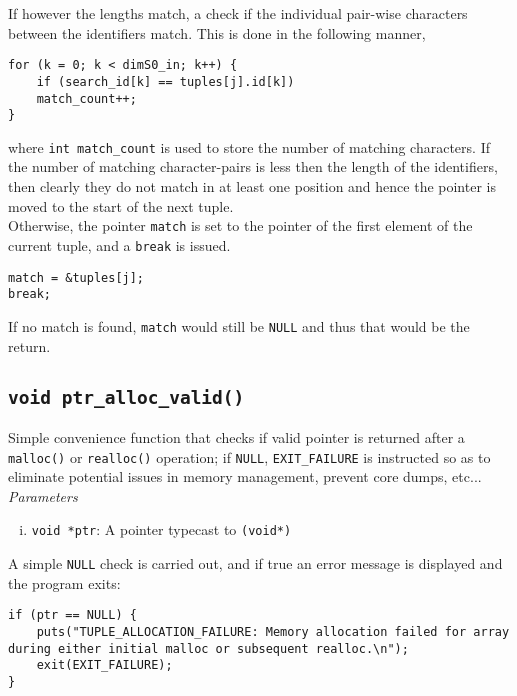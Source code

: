 \documentclass[10pt, a4paper, oneside]{memoir}
\begin{document}
	If however the lengths match, a check if the individual pair-wise characters between the identifiers match. This is done in the following manner,
\begin{verbatim}
for (k = 0; k < dimS0_in; k++) {
	if (search_id[k] == tuples[j].id[k])
	match_count++;
}
\end{verbatim}
where \texttt{int match_count} is used to store the number of matching characters. If the number of matching character-pairs is less then the length of the identifiers, then clearly they do not match in at least one position and hence the pointer is moved to the start of the next tuple.\\

Otherwise, the pointer \texttt{match} is set to the pointer of the first element of the current tuple, and a \texttt{break} is issued.
\begin{verbatim}
match = &tuples[j];
break;
\end{verbatim}

If no match is found, \texttt{match} would still be \texttt{NULL} and thus that would be the return. 

	\subsection{\texttt{void ptr_alloc_valid()}}
	
	Simple convenience function that checks if valid pointer is returned after a \texttt{malloc()} or \texttt{realloc()} operation; if \texttt{NULL}, \texttt{EXIT_FAILURE} is instructed so as to eliminate potential issues in memory management, prevent core dumps, etc...\\
	
	\textit{Parameters}
	\begin{enumerate}[i.]
		\item \texttt{void *ptr}: A pointer typecast to \texttt{(void*)}
	\end{enumerate}

	A simple \texttt{NULL} check is carried out, and if true an error message is displayed and the program exits:
\begin{verbatim}
if (ptr == NULL) {
	puts("TUPLE_ALLOCATION_FAILURE: Memory allocation failed for array during either initial malloc or subsequent realloc.\n");
	exit(EXIT_FAILURE);
}
\end{verbatim}
	
\end{document}
